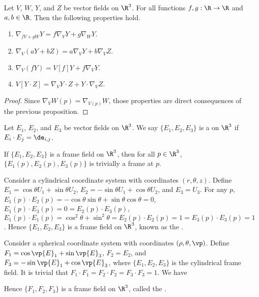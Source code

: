 \documentclass[10pt]{article}
\begin{document}
\begin{proposition}
    Let $V$, $W$, $Y$, and $Z$ be vector fields on ${\R}^{3}$. For all functions $f,g:\R\to\R$ and $a,b\in\R$. Then the following properties hold.
    \begin{enumerate}
        \item ${\nabla}_{fV+gW}Y=f{\nabla}_{V}Y+g{\nabla}_{W}Y$.
        \item ${\nabla}_{V}(aY+bZ)=a{\nabla}_{V}Y+b{\nabla}_{V}Z$.
        \item ${\nabla}_{V}(fY)=V[f]Y+f{\nabla}_{V}Y$.
        \item $V[Y\cdot Z]={\nabla}_{V}Y\cdot Z+Y\cdot{\nabla}_{V}Z$.
    \end{enumerate}
\end{proposition}
\begin{proof}
    Since ${\nabla}_{V}W(p)={\nabla}_{V(p)}W$, those properties are direct consequences of the previous proposition.
\end{proof}
\begin{definition}
    Let ${E}_{1}$, ${E}_{2}$, and ${E}_{3}$ be vector fields on ${\R}^{3}$. We say $\{{E}_{1},{E}_{2},{E}_{3}\}$ is a  on ${\R}^{3}$ if ${E}_{i}\cdot{E}_{j}={\de}_{i,j}$.
\end{definition}
\par
If $\{{E}_{1},{E}_{2},{E}_{3}\}$ is a frame field on ${\R}^{3}$, then for all $p\in{\R}^{3}$, $\{{E}_{1}(p),{E}_{2}(p),{E}_{3}(p)\}$ is trivially a frame at $p$.
\begin{example}
    Consider a cylindrical coordinate system with coordinates $(r,\theta,z)$. Define ${E}_{1}=\cos\theta{U}_{1}+\sin\theta{U}_{2}$, ${E}_{2}=-\sin\theta{U}_{1}+\cos\theta{U}_{2}$, and ${E}_{3}={U}_{3}$. For any $p$, ${E}_{1}(p)\cdot{E}_{2}(p)=-\cos\theta\sin\theta+\sin\theta\cos\theta=0$, ${E}_{1}(p)\cdot{E}_{3}(p)=0={E}_{2}(p)\cdot{E}_{3}(p)$, ${E}_{1}(p)\cdot{E}_{1}(p)={\cos}^{2}\theta+{\sin}^{2}\theta={E}_{2}(p)\cdot{E}_{2}(p)=1={E}_{3}(p)\cdot{E}_{3}(p)=1$. Hence $\{{E}_{1},{E}_{2},{E}_{3}\}$ is a frame field on ${\R}^{3}$, known as the .
\end{example}
\begin{example}
    Consider a spherical coordinate system with coordinates $(\rho,\theta,\vp)$. Define ${F}_{1}=\cos\vp{E}_{1}+\sin\vp{E}_{3}$, ${F}_{2}={E}_{2}$, and ${F}_{3}=-\sin\vp{E}_{1}+\cos\vp{E}_{3}$, where $\{{E}_{1},{E}_{2},{E}_{3}\}$ is the cylindrical frame field. It is trivial that ${F}_{1}\cdot{F}_{1}={F}_{2}\cdot{F}_{2}={F}_{3}\cdot{F}_{3}=1$. We have 

    Hence $\{{F}_{1},{F}_{2},{F}_{3}\}$ is a frame field on ${\R}^{3}$, called the .
\end{example}
\end{document}
